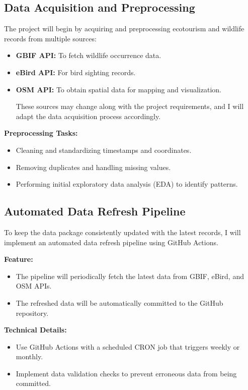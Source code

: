 \documentclass{article}
\begin{document}
\subsection{Data Acquisition and Preprocessing}
The project will begin by acquiring and preprocessing ecotourism and wildlife records from multiple sources:
\begin{itemize}
    \item \textbf{GBIF API:} To fetch wildlife occurrence data.
    \item \textbf{eBird API:} For bird sighting records.
    \item \textbf{OSM API:} To obtain spatial data for mapping and visualization.

These sources may change along with the project requirements, and I will adapt the data acquisition process accordingly.
\end{itemize}

\textbf{Preprocessing Tasks:}
\begin{itemize}
    \item Cleaning and standardizing timestamps and coordinates.
    \item Removing duplicates and handling missing values.
    \item Performing initial exploratory data analysis (EDA) to identify patterns.
\end{itemize}

\subsection{Automated Data Refresh Pipeline}
To keep the data package consistently updated with the latest records, I will implement an automated data refresh pipeline using GitHub Actions.

\textbf{Feature:}
\begin{itemize}
    \item The pipeline will periodically fetch the latest data from GBIF, eBird, and OSM APIs.
    \item The refreshed data will be automatically committed to the GitHub repository.
\end{itemize}

\textbf{Technical Details:}
\begin{itemize}
    \item Use GitHub Actions with a scheduled CRON job that triggers weekly or monthly.
    \item Implement data validation checks to prevent erroneous data from being committed.
\end{itemize}
\end{document}
